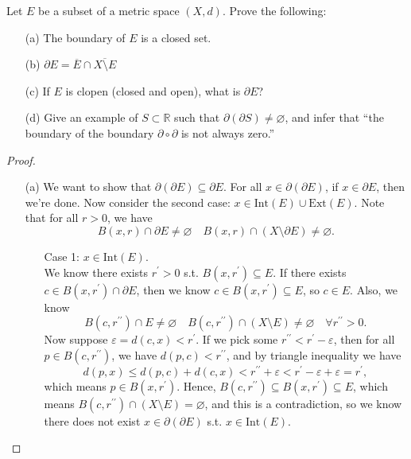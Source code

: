 \begin{problem}[20 pts]
    Let $E$ be a subset of a metric space $(X,d)$. Prove the following:
\begin{enumerate}
  \item[(a)] The boundary of $E$ is a closed set.  
  \item[(b)]  $\partial E= \overline{E} \cap    \overline{X \setminus E}$ 
    \item[(c)]  If $E$ is clopen (closed and open), what is $\partial E$?
  \item[(d)] Give an example of $S \subset \mathbb{R}$ such that $\partial(\partial S) \neq \varnothing$, and infer that ``the boundary of the boundary $\partial \circ \partial$ is not always zero.''
\end{enumerate}
\end{problem}
\begin{proof}
  \vphantom{text}
  \begin{itemize}
    \item [(a)] We want to show that \(\partial (\partial E) \subseteq \partial E\). For all \(x \in \partial (\partial E)\), if \(x \in \partial E\), then we're done. Now consider the second case: \(x \in \mathrm{Int}(E) \cup \mathrm{Ext}(E)\). Note that for all \(r > 0\), we have 
    \[
      B(x, r) \cap \partial E \neq \varnothing \quad B(x,r) \cap (X \setminus \partial E) \neq \varnothing.
    \]
    \begin{itemize}
      \item [Case 1:] \(x \in \mathrm{Int}(E) \). \\
      We know there exists \(r^{\prime} > 0\) s.t. \(B(x, r^{\prime}) \subseteq E\). If there exists \(c \in B(x, r^{\prime} ) \cap \partial E\), then we know \(c \in B(x, r^{\prime} ) \subseteq E\), so \(c \in E\). Also, we know 
      \[
        B(c, r^{\prime\prime} ) \cap E \neq \varnothing \quad B(c, r^{\prime\prime} ) \cap (X \setminus E) \neq \varnothing \quad \forall r^{\prime\prime} >0.
      \]
      Now suppose \(\varepsilon = d(c, x) < r^{\prime} \). If we pick some \(r^{\prime\prime} < r^{\prime}  - \varepsilon \), then for all \(p \in B(c, r^{\prime\prime} )\), we have \(d(p, c) < r^{\prime\prime} \), and by triangle inequality we have 
      \[
        d(p,x) \le d(p,c) + d(c,x) < r^{\prime\prime} + \varepsilon < r^{\prime} - \varepsilon + \varepsilon = r^{\prime} ,
      \] which means \(p \in B(x, r^{\prime} )\). Hence, \(B(c, r^{\prime\prime} ) \subseteq B(x, r^{\prime} ) \subseteq E\), which means \(B(c, r^{\prime\prime} ) \cap (X \setminus E) = \varnothing \), and this is a contradiction, so we know there does not exist \(x \in \partial (\partial E) \) s.t. \(x \in \mathrm{Int}(E) \).   

\end{itemize}
\end{itemize}
\end{proof}

